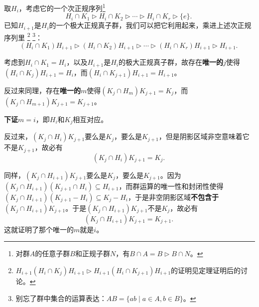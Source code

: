 取$H_i$，考虑它的一个次正规序列\footnote{对群$A$的任意子群$B$和正规子群$N$，有$B\cap A=B\rhd B\cap N$。}
\begin{equation}
    H_i\cap K_1\rhd H_i\cap K_2\rhd \cdots \rhd H_i\cap K_r\rhd \{e\}. 
~\end{equation}
已知$H_{i+1}$是$H_i$的一个极大正规真子群，我们可以把它利用起来，乘进上述次正规序列里
\footnote{$H_{i+1}(H_i\cap K_j)H_{i+1}\rhd H_{i+1}(H_i\cap K_{j+1})H_{i+1}$的证明见定理证明后的讨论。}
\footnote{别忘了群中集合的运算表达：$AB=\{ab\mid a\in A, b\in B\}$。}：
\begin{equation}
    (H_i\cap K_1)H_{i+1}\rhd (H_i\cap K_2)H_{i+1}\rhd \cdots \rhd (H_i\cap K_r)H_{i+1}\rhd H_{i+1}. 
~\end{equation}

考虑到$H_i\cap K_1=H_i$，以及$H_{i+1}$是$H_i$的极大正规真子群，故存在\textbf{唯一的}$j$使得$(H_i\cap K_j)H_{i+1}=H_i$，而$(H_i\cap K_{j+1})H_{i+1}=H_{i+1}$。

反过来同理，存在\textbf{唯一的}$m$使得$(K_j\cap H_m)K_{j+1}=K_j$，而$(K_j\cap H_{m+1})K_{j+1}=K_{j+1}$。






\textbf{下证}$m=i$，即$H_i$和$K_j$相互对应。







反过来，$(K_j\cap H_i)K_{j+1}$要么是$K_j$，要么是$K_{j+1}$，但是阴影区域非空意味着它不是$K_{j+1}$，故必有
\begin{equation}
    (K_j\cap H_i)K_{j+1} = K_j. 
~\end{equation}

同样，$(K_j\cap H_{i+1})K_{j+1}$要么是$K_j$，要么是$K_{j+1}$。因为$(K_j\cap H_{i+1})(K_{j+1}\cap H_i)\subseteq H_{i+1}$，而群运算的唯一性和封闭性使得$(K_j\cap H_{i+1})(K_{j+1} - H_i)\subseteq K_j-H_i$，于是非空阴影区域\textbf{不包含于}$(K_j\cap H_{i+1})K_{j+1}$。于是$(K_j\cap H_{i+1})K_{j+1}$不是$K_j$，故必有
\begin{equation}
    (K_j\cap H_{i+1})K_{j+1} = K_{j+1}. 
~\end{equation}
这就证明了那个唯一的$m$就是$i$。









